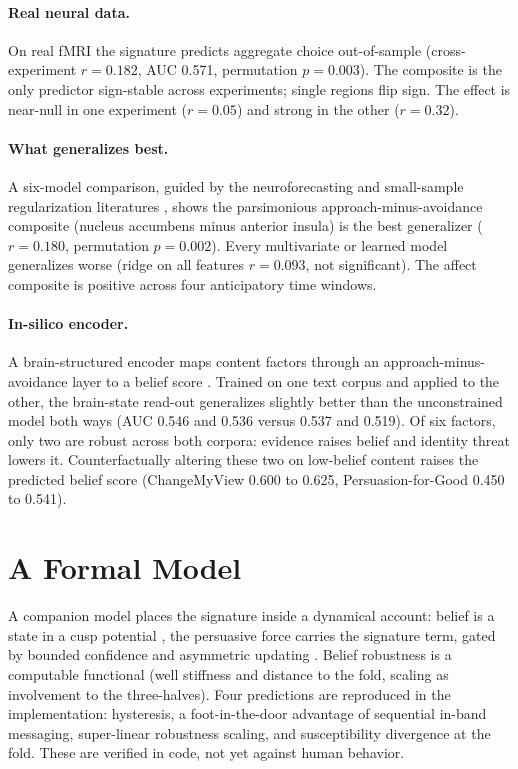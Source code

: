 \documentclass[11pt]{article}
\begin{document}
\paragraph{Real neural data.} On real fMRI the signature predicts aggregate choice out-of-sample
(cross-experiment $r = 0.182$, AUC 0.571, permutation $p = 0.003$). The composite is the only predictor
sign-stable across experiments; single regions flip sign. The effect is near-null in one experiment
($r = 0.05$) and strong in the other ($r = 0.32$).

\paragraph{What generalizes best.} A six-model comparison, guided by the neuroforecasting and small-sample
regularization literatures \citep{genevsky2017when, tong2020brain, mortazavi2025deconstructing}, shows the
parsimonious approach-minus-avoidance composite (nucleus accumbens minus anterior insula) is the best
generalizer ($r = 0.180$, permutation $p = 0.002$). Every multivariate or learned model generalizes worse
(ridge on all features $r = 0.093$, not significant). The affect composite is positive across four
anticipatory time windows.

\paragraph{In-silico encoder.} A brain-structured encoder maps content factors through an
approach-minus-avoidance layer to a belief score \citep{wang2025foundation, walters2022predicting,
kriegeskorte2018interpreting}. Trained on one text corpus and applied to the other, the brain-state
read-out generalizes slightly better than the unconstrained model both ways (AUC 0.546 and 0.536 versus
0.537 and 0.519). Of six factors, only two are robust across both corpora: evidence raises belief and
identity threat lowers it. Counterfactually altering these two on low-belief content raises the predicted
belief score (ChangeMyView 0.600 to 0.625, Persuasion-for-Good 0.450 to 0.541).

\section{A Formal Model}
A companion model places the signature inside a dynamical account: belief is a state in a cusp potential
\citep{vandermaas2003sudden}, the persuasive force carries the signature term, gated by bounded confidence
\citep{hegselmann2002opinion} and asymmetric updating \citep{palminteri2022computational,
lefebvre2017behavioural}. Belief robustness is a computable functional (well stiffness and distance to the
fold, scaling as involvement to the three-halves). Four predictions are reproduced in the implementation:
hysteresis, a foot-in-the-door advantage of sequential in-band messaging, super-linear robustness scaling,
and susceptibility divergence at the fold. These are verified in code, not yet against human behavior.
\end{document}
